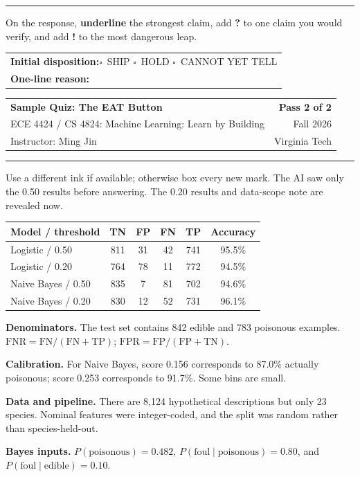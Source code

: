 \documentclass[10pt]{article}
\makeatletter
\newcommand{\CourseCodes}{ECE 4424 / CS 4824}
\newcommand{\CourseName}{Machine Learning: Learn by Building}
\newcommand{\CourseTerm}{Fall 2026}
\newcommand{\InstructorName}{Ming Jin}
\newcommand{\InstitutionName}{Virginia Tech}
\newcommand{\QuizNumber}{Sample Quiz}
\newcommand{\QuizTitle}{The EAT Button}
\newcommand{\checkbox}{\(\square\)}
\newcommand{\QuizHeader}[1]{%
  \begin{tabularx}{\linewidth}{@{}Lr@{}}
    {\Large\bfseries \QuizNumber: \QuizTitle} & {\bfseries #1} \\
    \CourseCodes: \CourseName & \CourseTerm \\
    Instructor: \InstructorName & \InstitutionName
  \end{tabularx}
  \vspace{0.35em}\hrule\vspace{0.55em}
}
\newcommand{\Subhead}[1]{%
  \par\vspace{0.55em}{\bfseries #1}\par\vspace{0.18em}
}
\makeatother
\begin{document}
\vspace{0.15em}\hrule

\Subhead{Pass 1: Cold audit (3 minutes)}
On the response, \textbf{underline} the strongest claim, add \textbf{?} to one claim you would verify, and add \textbf{!} to the most dangerous leap.

\vspace{0.55em}
\begin{tabularx}{\linewidth}{@{}L@{}}
  \textbf{Initial disposition:}\quad \checkbox\ SHIP \qquad \checkbox\ HOLD \qquad \checkbox\ CANNOT YET TELL \\
  \addlinespace[0.55em]
  \textbf{One-line reason:}\quad \hrulefill
\end{tabularx}

\newpage
\QuizHeader{Pass 2 of 2}

{\small Use a different ink if available; otherwise box every new mark. The AI saw only the 0.50 results before answering. The 0.20 results and data-scope note are revealed now.}

\Subhead{Evidence packet}
\begin{tabularx}{\linewidth}{@{}L*{5}{C}@{}}
  \toprule
  \textbf{Model / threshold} & \textbf{TN} & \textbf{FP} & \textbf{FN} & \textbf{TP} & \textbf{Accuracy} \\
  \midrule
  Logistic / 0.50    & 811 & 31 & 42 & 741 & 95.5\% \\
  Logistic / 0.20    & 764 & 78 & 11 & 772 & 94.5\% \\
  Naive Bayes / 0.50 & 835 &  7 & 81 & 702 & 94.6\% \\
  Naive Bayes / 0.20 & 830 & 12 & 52 & 731 & 96.1\% \\
  \bottomrule
\end{tabularx}

\vspace{0.35em}
{\small
\textbf{Denominators.} The test set contains 842 edible and 783 poisonous examples. \(\mathrm{FNR}=\mathrm{FN}/(\mathrm{FN}+\mathrm{TP})\); \(\mathrm{FPR}=\mathrm{FP}/(\mathrm{FP}+\mathrm{TN})\).

\vspace{0.35em}
\begin{minipage}[t]{0.485\linewidth}
\textbf{Calibration.} For Naive Bayes, score 0.156 corresponds to 87.0\% actually poisonous; score 0.253 corresponds to 91.7\%. Some bins are small.
\end{minipage}\hfill
\begin{minipage}[t]{0.485\linewidth}
\textbf{Data and pipeline.} There are 8,124 hypothetical descriptions but only 23 species. Nominal features were integer-coded, and the split was random rather than species-held-out.
\end{minipage}

\vspace{0.35em}
\textbf{Bayes inputs.} \(P(\text{poisonous})=0.482\), \(P(\text{foul}\mid\text{poisonous})=0.80\), and \(P(\text{foul}\mid\text{edible})=0.10\).
}
\end{document}
